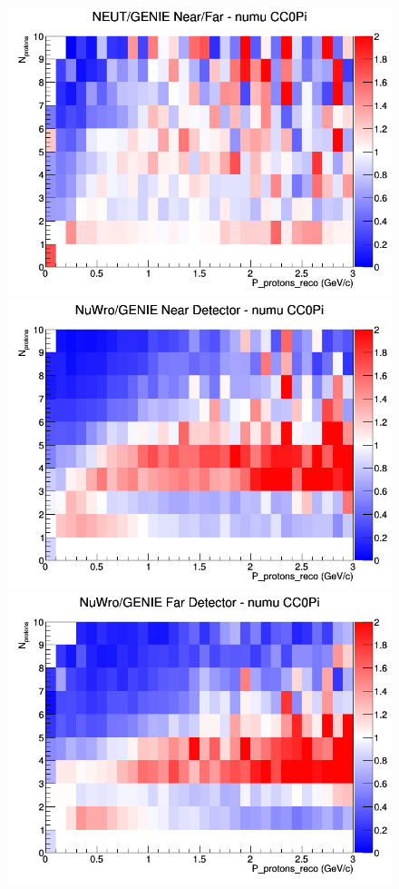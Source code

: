 \begin{figure}[h]
\endminipage
{}
\includegraphics[width=\linewidth]{eff_N_P/GAr/protons/ratios/CC0Pi_NEUT_GENIE_numu_NF_N_P.png}
\endminipage
\newline
{}
\includegraphics[width=\linewidth]{eff_N_P/GAr/protons/ratios/CC0Pi_NuWro_GENIE_numu_near_N_P.png}
\endminipage
{}
\includegraphics[width=\linewidth]{eff_N_P/GAr/protons/ratios/CC0Pi_NuWro_GENIE_numu_far_N_P.png}

\end{figure}
